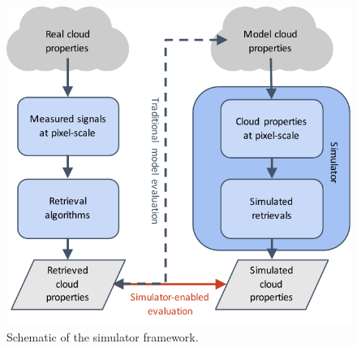 \begin{figure}
	\centering
	\includegraphics{graphics/simulator_schematic.pdf}
	\caption{Schematic of the simulator framework.}
	\label{simulator_schematic}
\end{figure}

